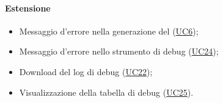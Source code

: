 \paragraph*{Estensione}
\begin{itemize}
  \item Messaggio d'errore nella generazione del  (\hyperref[UC6]{UC6});
  \item Messaggio d'errore nello strumento di debug (\hyperref[UC24]{UC24});
  \item Download del log di debug (\hyperref[UC22]{UC22});
  \item Visualizzazione della tabella di debug (\hyperref[UC25]{UC25}).
\end{itemize}